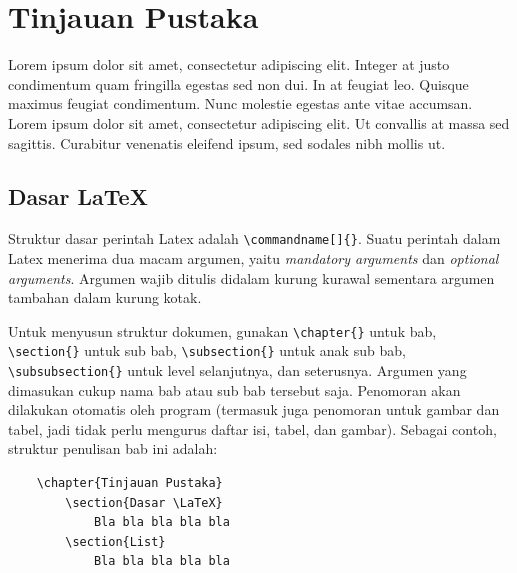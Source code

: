\chapter{Tinjauan Pustaka}

Lorem ipsum dolor sit amet, consectetur adipiscing elit. Integer at justo condimentum quam fringilla egestas sed non dui. In at feugiat leo. Quisque maximus feugiat condimentum. Nunc molestie egestas ante vitae accumsan. Lorem ipsum dolor sit amet, consectetur adipiscing elit. Ut convallis at massa sed sagittis. Curabitur venenatis eleifend ipsum, sed sodales nibh mollis ut.


\section{Dasar \LaTeX}

Struktur dasar perintah Latex adalah \verb|\commandname[]{}|. Suatu perintah dalam Latex menerima dua macam argumen, yaitu \textit{mandatory arguments} dan \textit{optional arguments}. Argumen wajib ditulis didalam kurung kurawal sementara argumen tambahan dalam kurung kotak. 

Untuk menyusun struktur dokumen, gunakan \verb|\chapter{}| untuk bab, \verb|\section{}| untuk sub bab, \verb|\subsection{}| untuk anak sub bab, \verb|\subsubsection{}| untuk level selanjutnya, dan seterusnya. Argumen yang dimasukan cukup nama bab atau sub bab tersebut saja. Penomoran akan dilakukan otomatis oleh program (termasuk juga penomoran untuk gambar dan tabel, jadi tidak perlu mengurus daftar isi, tabel, dan gambar). Sebagai contoh, struktur penulisan bab ini adalah: 

\begin{verbatim}
    \chapter{Tinjauan Pustaka}
        \section{Dasar \LaTeX}
            Bla bla bla bla bla
        \section{List}
            Bla bla bla bla bla
\end{verbatim}

